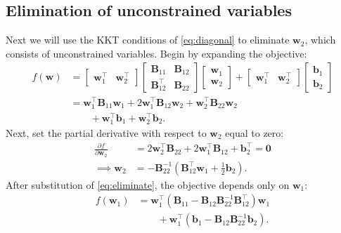 \documentclass[journal,twoside]{IEEEtran}
\renewcommand{\vec}[1]{\mathbf{#1}}
\begin{document}
\subsection{Elimination of unconstrained variables}\label{sec:solution-eliminate}
Next we will use the KKT conditions of \eqref{eq:diagonal} to eliminate $\vec{w}_2$, which consists of unconstrained variables. Begin by expanding the objective:
\begin{align*}
f(\vec{w}) &=
\begin{bmatrix} \vec{w}_1^\top & \vec{w}_2^\top \end{bmatrix}
\begin{bmatrix} \mathbf{B}_{11} & \mathbf{B}_{12} \\ \mathbf{B}_{12}^\top & \mathbf{B}_{22}\end{bmatrix}
\begin{bmatrix} \vec{w}_1 \\ \vec{w}_2 \end{bmatrix} +
\begin{bmatrix} \vec{w}_1^\top & \vec{w}_2^\top \end{bmatrix}
\begin{bmatrix} \vec{b}_1 \\ \vec{b}_2\end{bmatrix} \\
&=
\vec{w}_1^\top \mathbf{B}_{11}\vec{w}_1 + 2\vec{w}_1^\top \mathbf{B}_{12}\vec{w}_2 + \vec{w}_2^\top \mathbf{B}_{22}\vec{w}_2 \\
&\qquad + \vec{w}_1^\top \vec{b}_1 + \vec{w}_2^\top \vec{b}_2.
\end{align*}
Next, set the partial derivative with respect to $\vec{w}_2$ equal to zero:
\begin{align}
\nonumber \frac{\partial f}{\partial \vec{w}_2} &= 2\vec{w}_2^\top \mathbf{B}_{22} + 2\vec{w}_1^\top \mathbf{B}_{12} + \vec{b}_2^\top = \vec{0} \\
\label{eq:eliminate} \implies \vec{w}_2 &= -\mathbf{B}_{22}^{-1}\left(\mathbf{B}_{12}^\top\vec{w}_1 +
\frac{1}{2}\vec{b}_2 \right).
\end{align}
After substitution of \eqref{eq:eliminate}, the objective depends only on $\vec{w}_1$:
\begin{align*}
f(\vec{w}_1) &= \vec{w}_1^\top\left(\mathbf{B}_{11} - \mathbf{B}_{12} \mathbf{B}_{22}^{-1}
\mathbf{B}_{12}^\top\right)\vec{w}_1 \\
&\qquad + \vec{w}_1^\top (\vec{b}_1 - \mathbf{B}_{12} \mathbf{B}_{22}^{-1}\vec{b}_2).
\end{align*}
\end{document}
